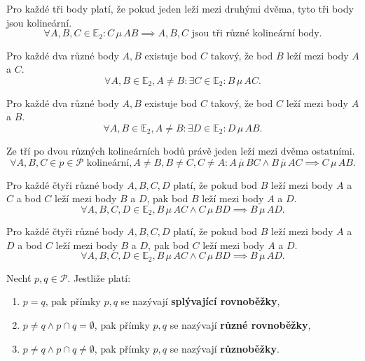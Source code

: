 \begin{axiom}
  Pro každé tři body platí, že pokud jeden leží mezi druhými dvěma, tyto tři body jsou kolineární.
  $$\forall A, B, C \in \mathbb E_2: C\, \mu\, AB \implies A, B, C \text{ jsou tři různé kolineární body.}$$
\end{axiom}

\begin{axiom}
  Pro každé dva různé body $A,B$ existuje bod $C$ takový, že bod $B$ leží mezi body $A$ a $C$.
  $$\forall A, B \in \mathbb E_2, A \neq B: \exists C \in \mathbb E_2: B\, \mu \,AC.$$
\end{axiom}

\begin{axiom}
Pro každé dva různé body $A,B$ existuje bod $C$ takový, že bod $C$ leží mezi body $A$ a $B$.
  $$\forall A, B \in \mathbb E_2, A \neq B: \exists D \in \mathbb E_2: D\, \mu \,AB.$$
\end{axiom}

\begin{axiom}
  Ze tří po dvou různých kolineárních bodů právě jeden leží mezi dvěma ostatními.
  $$\forall A, B, C \in p \in \mathscr P \text{ kolineární}, A \neq B, B\neq C, C\neq A: A \,\overline{\mu}\, BC \land B \,\overline{\mu}\, AC \implies C \,\mu \,AB.$$
\end{axiom}

\begin{axiom}
  Pro každé čtyři různé body $A,B,C,D$ platí, že pokud bod $B$ leží mezi body $A$ a $C$ a bod $C$ leží mezi body $B$ a $D$, pak bod $B$ leží mezi body $A$ a $D$.
  $$\forall A, B, C, D \in \mathbb E_2, B\, \mu\, AC \land C\, \mu\, BD \implies B\, \mu\, AD.$$
\end{axiom}

\begin{axiom}
  Pro každé čtyři různé body $A,B,C,D$ platí, že pokud bod $B$ leží mezi body $A$ a $D$ a bod $C$ leží mezi body $B$ a $D$, pak bod $C$ leží mezi body $A$ a $D$.
  $$\forall A, B, C, D \in \mathbb E_2, B\, \mu \,AC \land C\, \mu\, BD \implies B \,\mu\, AD.$$
\end{axiom}

\begin{definition}
  Nechť $p,q\in \mathscr P$. Jestliže platí:
  \begin{enumerate}[$i.$]
    \item $p=q$, pak přímky $p,q$ se nazývají \textbf{splývající rovnoběžky},
    \item $p \ne q \land p\cap q = \emptyset$, pak přímky $p,q$ se nazývají \textbf{různé rovnoběžky},
    \item $p \ne q \land p\cap q \ne \emptyset$, pak přímky $p,q$ se nazývají \textbf{různoběžky}.
  \end{enumerate}
\end{definition}

